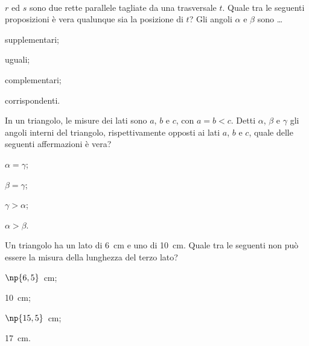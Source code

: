 \begin{esercizio}
\label{ese:3.111}
~\\
\noindent\begin{minipage}{0.65\textwidth}
$r$ ed $s$ sono due rette parallele tagliate da una trasversale $t$. Quale tra le seguenti proposizioni è vera qualunque sia la posizione di $t$?
Gli angoli $\alpha$ e $\beta$ sono \ldots{}
\begin{enumeratea}
\item supplementari;
\item uguali;
\item complementari;
\item corrispondenti.
\end{enumeratea}
\end{minipage}\hfil
\begin{minipage}{0.35\textwidth}
\centering
\end{minipage}
\end{esercizio}

\begin{esercizio}
\label{ese:3.112}
In un triangolo, le misure dei lati sono $a$, $b$ e $c$, con $a = b < c$. Detti $\alpha$, $\beta$ e $\gamma$ gli angoli interni del triangolo, rispettivamente opposti ai lati $a$, $b$ e $c$, quale delle seguenti affermazioni è vera?
\begin{enumeratea}
\item $\alpha = \gamma$;
\item $\beta = \gamma$;
\item $\gamma > \alpha$;
\item $\alpha > \beta$.
\end{enumeratea}
\end{esercizio}

\begin{esercizio}
\label{ese:3.113}
Un triangolo ha un lato di 6~cm e uno di 10~cm. Quale tra le seguenti non può essere la misura della lunghezza del terzo lato?
\begin{enumeratea}
\item $\np{6,5}$~cm;
\item 10~cm;
\item $\np{15,5}$~cm;
\item 17~cm.
\end{enumeratea}
\end{esercizio}
